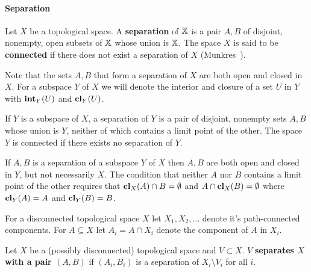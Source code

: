 

\paragraph{Separation}

Let $X$ be a topological space. A \textbf{separation} of $\mathbb{X}$ is a pair $A, B$ of disjoint, nonempty, open subsets of $\mathbb{X}$ whose union is $\mathbb{X}$.
The space $X$ is said to be \textbf{connected} if there does not exist a separation of $X$ (Munkres~\cite{munkres00topology}).

Note that the sets $A, B$ that form a separation of $X$ are both open and closed in $X$.
For a subspace $Y$ of $X$ we will denote the interior and closure of a set $U$ in $Y$ with $\mathbf{int}_Y(U)$ and $\mathbf{cl}_Y(U)$.

\begin{lemma}
  If $Y$ is a subspace of $X$, a separation of $Y$ is a pair of disjoint, nonempty sets $A, B$ whose union is $Y$, neither of which contains a limit point of the other.
  The space $Y$ is connected if there exists no separation of $Y$.
\end{lemma}

If $A, B$ is a separation of a subspace $Y$ of $X$ then $A, B$ are both open and closed in $Y$, but not necessarily $X$.
The condition that neither $A$ nor $B$ contains a limit point of the other requires that $\mathbf{cl}_X(A)\cap B = \emptyset$ and $A\cap \mathbf{cl}_X(B) =\emptyset$ where $\mathbf{cl}_Y(A) = A$ and $\mathbf{cl}_Y(B) = B$.


For a disconnected topological space $X$ let $X_1, X_2, \ldots$ denote it's path-connected components.
For $A\subseteq X$ let $A_i = A\cap X_i$ denote the component of $A$ in $X_i$.

\begin{definition}
  Let $X$ be a (possibly disconnected) topological space and $V\subset X$.
  $V$ \textbf{separates $X$ with a pair $(A, B)$} if $(A_i, B_i)$ is a separation of $X_i\setminus V_i$ for all $i$.
\end{definition}

